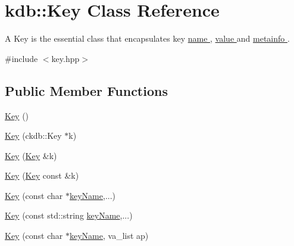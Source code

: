 \hypertarget{classkdb_1_1Key}{\section{kdb\-:\-:Key Class Reference}
\label{classkdb_1_1Key}
}


A Key is the essential class that encapsulates key \hyperlink{group__keyname}{name }, \hyperlink{group__keyvalue}{value } and \hyperlink{group__keymeta}{metainfo }.   




{\ttfamily \#include $<$key.\-hpp$>$}

\subsection*{Public Member Functions}
\begin{DoxyCompactItemize}
\item 
\hyperlink{classkdb_1_1Key_a5679f5cae63caddd64a60388b9cc77fa}{Key} ()
\item 
\hyperlink{classkdb_1_1Key_a41ada34fa45a270e63444267621b59c9}{Key} (ckdb\-::\-Key $\ast$k)
\item 
\hyperlink{classkdb_1_1Key_a33f63e153a7d832a54e02c0cba569feb}{Key} (\hyperlink{classkdb_1_1Key}{Key} \&k)
\item 
\hyperlink{classkdb_1_1Key_ab68da8be743b2f635ff8e28dfaeaaea6}{Key} (\hyperlink{classkdb_1_1Key}{Key} const \&k)
\item 
\hyperlink{classkdb_1_1Key_a15b2e9e1cc323cde05b0d1d3805656e0}{Key} (const char $\ast$\hyperlink{group__keyname_ga8e805c726a60da921d3736cda7813513}{key\-Name},...)
\begin{DoxyCompactList}\small\item\em \end{DoxyCompactList}\item 
\hyperlink{classkdb_1_1Key_acbf7642258d46da2c4427f4104cf01ee}{Key} (const std\-::string \hyperlink{group__keyname_ga8e805c726a60da921d3736cda7813513}{key\-Name},...)
\begin{DoxyCompactList}\small\item\em \end{DoxyCompactList}\item 
\hyperlink{classkdb_1_1Key_aa0dc94c7e676a0d280e5817e4c6238d3}{Key} (const char $\ast$\hyperlink{group__keyname_ga8e805c726a60da921d3736cda7813513}{key\-Name}, va\-\_\-list ap)
\begin{DoxyCompactList}\small\item\em \end{DoxyCompactList}\item 

\end{DoxyCompactItemize}
